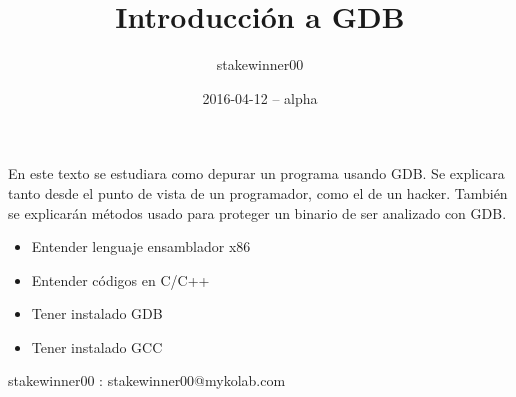 \documentclass{fennix_plantilla/fennix}
\begin{document}
\title{Introducción a GDB}
\author{stakewinner00}
\date{2016-04-12 -- alpha}
\maketitle
\begin{resumen}
En este texto se estudiara como depurar un programa usando GDB. Se explicara tanto desde el punto de vista de un programador, como el de un hacker. También se explicarán métodos usado para proteger un binario de ser analizado con GDB.
\end{resumen}

\begin{requisitos}
\begin{itemize}
\item Entender lenguaje ensamblador x86
\item Entender códigos en C/C++
\item Tener instalado GDB
\item Tener instalado GCC
\end{itemize}
\end{requisitos}


%
%
%

\begin{colabs}
stakewinner00 : stakewinner00@mykolab.com
\end{colabs}
\end{document}
